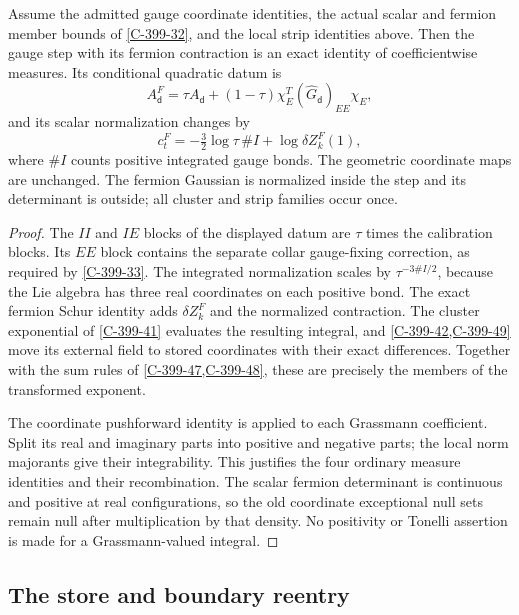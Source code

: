\documentclass[11pt,letterpaper,reqno]{amsart}
\makeatletter
\theoremstyle{definition}
\newcommand{\ms@minorstart}{%
  \pushQED{\qed}\renewcommand{\qedsymbol}{$\blacksquare$}}
\newenvironment{proposition}[1][]{\ms@minorstart\ms@proposition[#1]}
  {\popQED\endms@proposition}
\theoremstyle{remark}
\makeatother
\begin{document}
\begin{proposition}[The exact step with matter]\label{C-399-43}
Assume the admitted gauge coordinate identities, the
actual scalar and fermion member bounds of
\cref{C-399-32}, and the local strip identities above.
Then the gauge step with its fermion contraction is an
exact identity of coefficientwise measures. Its
conditional quadratic datum is
\[
 A_{\mathsf d}^F=\tau A_{\mathsf d}
       +(1-\tau)\chi_E^T(\widehat G_{\mathsf d})_{EE}\chi_E,
\]
and its scalar normalization changes by
\[
 c_t^F=-\tfrac32\log\tau\,\# I+\log\delta Z_k^F(1),
\]
where $\#I$ counts positive integrated gauge bonds.
The geometric coordinate maps are unchanged. The
fermion Gaussian is normalized inside the step and
its determinant is outside; all cluster and strip
families occur once.
\end{proposition}
\begin{proof}
The $II$ and $IE$ blocks of the displayed datum are
$\tau$ times the calibration blocks. Its $EE$ block
contains the separate collar gauge-fixing correction,
as required by \cref{C-399-33}. The integrated
normalization scales by $\tau^{-3\#I/2}$, because
the Lie algebra has three real coordinates on each
positive bond. The exact fermion Schur identity
adds $\delta Z_k^F$ and the normalized contraction.
The cluster exponential of \cref{C-399-41} evaluates
the resulting integral, and \cref{C-399-42,C-399-49}
move its external field to stored coordinates with
their exact differences. Together with the sum rules
of \cref{C-399-47,C-399-48}, these are precisely the
members of the transformed exponent.

The coordinate pushforward identity is applied to
each Grassmann coefficient. Split its real and
imaginary parts into positive and negative parts;
the local norm majorants give their integrability.
This justifies the four ordinary measure identities
and their recombination. The scalar fermion
determinant is continuous and positive at real
configurations, so the old coordinate exceptional
null sets remain null after multiplication by that
density. No positivity or Tonelli assertion is made
for a Grassmann-valued integral.
\end{proof}

\subsection{The store and boundary reentry}
\end{document}
